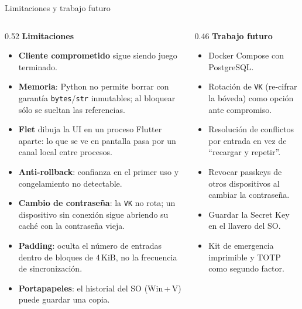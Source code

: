 \documentclass[aspectratio=169,10pt]{beamer}
\newcommand{\key}[1]{\textcolor{cripto}{\texttt{#1}}}
\begin{document}
\begin{frame}{Limitaciones y trabajo futuro}
  \begin{columns}[T]
    \begin{column}{0.52\textwidth}
      \footnotesize
      \textbf{Limitaciones}
      \begin{itemize}
        \item \textbf{Cliente comprometido} sigue siendo juego terminado.
        \item \textbf{Memoria}: Python no permite borrar con garantía \texttt{bytes}/\texttt{str}
              inmutables; al bloquear sólo se sueltan las referencias.
        \item \textbf{Flet} dibuja la UI en un proceso Flutter aparte: lo que se ve en pantalla
              pasa por un canal local entre procesos.
        \item \textbf{Anti-rollback}: confianza en el primer uso y congelamiento no detectable.
        \item \textbf{Cambio de contraseña}: la \key{VK} no rota; un dispositivo sin conexión
              sigue abriendo su caché con la contraseña vieja.
        \item \textbf{Padding}: oculta el número de entradas dentro de bloques de 4\,KiB, no
              la frecuencia de sincronización.
        \item \textbf{Portapapeles}: el historial del SO (Win\,+\,V) puede guardar una copia.
      \end{itemize}
    \end{column}
    \begin{column}{0.46\textwidth}
      \footnotesize
      \textbf{Trabajo futuro}
      \begin{itemize}
        \item Docker Compose con PostgreSQL.
        \item Rotación de \key{VK} (re-cifrar la bóveda) como opción ante compromiso.
        \item Resolución de conflictos por entrada en vez de ``recargar y repetir''.
        \item Revocar passkeys de otros dispositivos al cambiar la contraseña.
        \item Guardar la Secret Key en el llavero del SO.
        \item Kit de emergencia imprimible y TOTP como segundo factor.
      \end{itemize}
    \end{column}
  \end{columns}
\end{frame}
\end{document}
